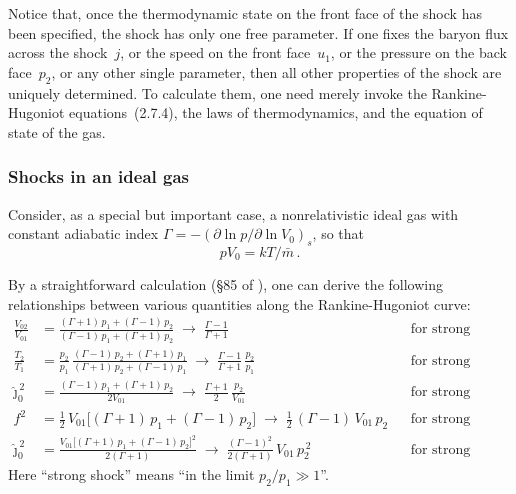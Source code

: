 Notice that, once the thermodynamic state on the front face of the shock
has been specified, the shock has only one free parameter.  If one fixes the
baryon flux across the shock~$j$, or the speed on the front face~$u_1$, or
the pressure on the back face~$p_2$, or any other single parameter, then all
other properties of the shock are uniquely determined.  To calculate them, one
need merely invoke the Rankine-Hugoniot equations~(2.7.4), the laws of
thermodynamics, and the equation of state of the gas.


\subsubsection*{Shocks in an ideal gas}

Consider, as a special but important case, a nonrelativistic ideal gas with
constant adiabatic index $\Gamma = -(\partial\ln p/\partial\ln V_0)_s$, so
that
%
\begin{equation}
  pV_0 = kT/\bar{m}\,.
  \tag{2.7.9}
\end{equation}

By a straightforward calculation (\S85 of \citealt{LandauLifshitz1959}), one
can derive the following relationships between various quantities along the
Rankine-Hugoniot curve:
%
\begin{equation}
\begin{aligned}
  \frac{V_{02}}{V_{01}} &= \frac{(\Gamma+1)\,p_1 + (\Gamma-1)\,p_2}
                               {(\Gamma-1)\,p_1 + (\Gamma+1)\,p_2}
  \;\to\; \frac{\Gamma-1}{\Gamma+1}
  &&\text{for strong shock,} \\[6pt]
  \frac{T_2}{T_1} &= \frac{p_2}{p_1}\,
    \frac{(\Gamma-1)\,p_2 + (\Gamma+1)\,p_1}
         {(\Gamma+1)\,p_2 + (\Gamma-1)\,p_1}
  \;\to\; \frac{\Gamma-1}{\Gamma+1}\,\frac{p_2}{p_1}
  &&\text{for strong shock,} \\[6pt]
  \hat{\jmath}_0^{\,2} &=
    \frac{(\Gamma-1)\,p_1 + (\Gamma+1)\,p_2}{2V_{01}}
  \;\to\; \frac{\Gamma+1}{2}\,\frac{p_2}{V_{01}}
  &&\text{for strong shock,} \\[6pt]
  f^2 &= \tfrac{1}{2}\,V_{01}
    \bigl[(\Gamma+1)\,p_1 + (\Gamma-1)\,p_2\bigr]
  \;\to\; \tfrac{1}{2}\,(\Gamma-1)\,V_{01}\,p_2
  &&\text{for strong shock,} \\[6pt]
  \hat{\jmath}_0^{\,2} &=
    \frac{V_{01}\bigl[(\Gamma+1)\,p_1 + (\Gamma-1)\,p_2\bigr]^2}
         {2(\Gamma+1)}
  \;\to\; \frac{(\Gamma-1)^2}{2(\Gamma+1)}\,V_{01}\,p_2^{\,2}
  &&\text{for strong shock.}
\end{aligned}
  \tag{2.7.10}
\end{equation}
%
Here ``strong shock'' means ``in the limit $p_2/p_1 \gg 1$''.

